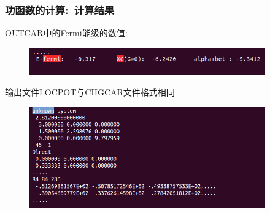 {
\frametitle{\rm{功函数的计算:~计算结果}}
\textrm{OUTCAR}中的\textrm{Fermi}能级的数值:
\begin{figure}[h!]
\centering
\vskip -3pt
\includegraphics[width=4.0in,viewport=0 20 460 50,clip]{Figures/Pt_surface-workfunction-Fermi.png}
\caption{\fontsize{6.2pt}{5.2pt}}%
\label{Pt_surface-workfunction-LOCPOT}
\end{figure}
输出文件\textrm{LOCPOT}与\textrm{CHGCAR}文件格式相同\\
{\fontsize{6.2pt}{5.2pt}}
\begin{figure}[h!]
	\vskip -5pt
\centering
\includegraphics[width=4.0in,viewport=0 10 480 250,clip]{Figures/Pt_surface-workfunction-LOCPOT.png}
\caption{\fontsize{6.2pt}{5.2pt}}%
\label{Pt_surface-workfunction-LOCPOT}
\end{figure}
}

